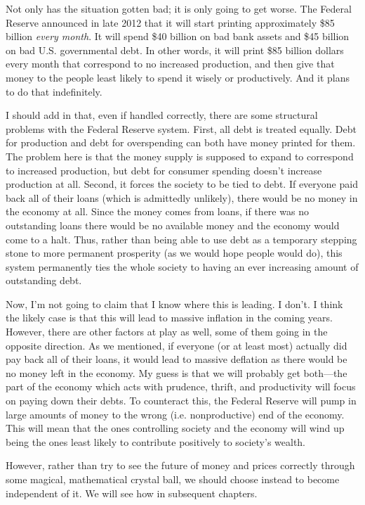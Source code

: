Not only has the situation gotten bad; it is only going to get worse.
The Federal Reserve announced in late 2012 that it will start printing
approximately \$85 billion \textit{every month}. It will spend \$40
billion on bad bank assets and \$45 billion on bad U.S. governmental debt. In other
words, it will print \$85 billion dollars every month that correspond
to no increased production, and then give that money to the people
least likely to spend it wisely or productively. And it plans to do
that indefinitely.

I should add in that, even if handled correctly, there are some structural
problems with the Federal Reserve system.  First, all debt is treated 
equally.  Debt for production and debt for overspending can both have
money printed for them.  The problem here is that the money supply is supposed
to expand to correspond to increased production, but debt for consumer
spending doesn't increase production at all. Second, it forces the society
to be tied to debt.  If everyone paid back all of their loans (which is 
admittedly unlikely), there would be no money in the economy at all.
Since the money comes from loans, if there was no outstanding loans
there would be no available money and the economy would come to a halt.  
Thus, rather than being able to use debt as a temporary stepping stone
to more permanent prosperity (as we would hope people would do), this
system permanently ties the whole society to having an ever increasing
amount of outstanding debt.

Now, I’m not going to claim that I know where this is leading. I don’t.
I think the likely case is that this will lead to massive inflation in
the coming years. 
However, there are other factors at play as well, some of them going in
the opposite direction.  As we mentioned, if everyone (or at least most)
actually did pay back all of their loans, it would lead to massive deflation as
there would be no money left in the economy.
My guess is that we will probably get both---the part of the economy
which acts with prudence, thrift, and productivity will focus on paying down
their debts.  To counteract this, the Federal Reserve will pump in large amounts
of money to the wrong (i.e. nonproductive) end of the economy.  This will mean
that the ones controlling society and the economy will wind up being the ones
least likely to contribute positively to society's wealth.

However, rather than try to see the future of money and prices correctly through some magical,
mathematical crystal ball, we should choose instead to become
independent of it.  We will see how in subsequent chapters.

